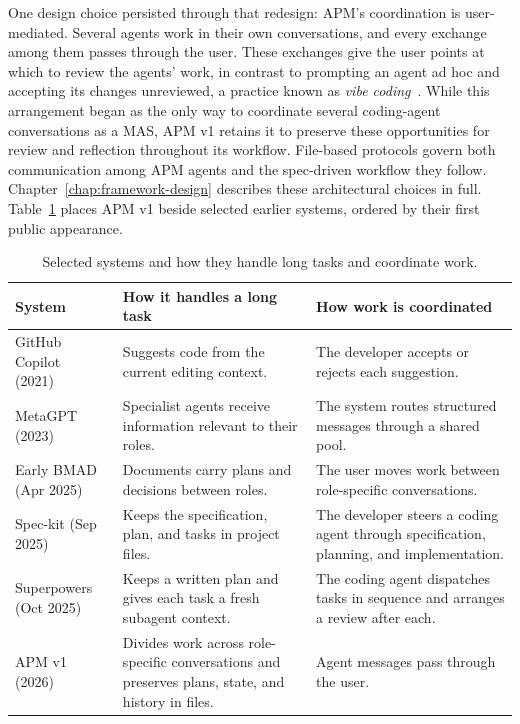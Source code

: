 One design choice persisted through that redesign: APM's coordination is user-mediated. Several agents work in their own conversations, and every exchange among them passes through the user. These exchanges give the user points at which to review the agents' work, in contrast to prompting an agent ad hoc and accepting its changes unreviewed, a practice known as \emph{vibe coding}~\cite{karpathy2025vibecoding, willison2025vibecoding}. While this arrangement began as the only way to coordinate several coding-agent conversations as a MAS, APM v1 retains it to preserve these opportunities for review and reflection throughout its workflow. File-based protocols govern both communication among APM agents and the spec-driven workflow they follow. Chapter~\ref{chap:framework-design} describes these architectural choices in full. Table~\ref{tab:background-systems-comparison} places APM v1 beside selected earlier systems, ordered by their first public appearance.

\begin{table}[H]
  \centering
  \small
  \setlength{\tabcolsep}{4pt}
  \caption{Selected systems and how they handle long tasks and coordinate work.}
  \label{tab:background-systems-comparison}
  \begin{tabular*}{\textwidth}{@{\extracolsep{\fill}}>{\raggedright\arraybackslash}p{}>{\raggedright\arraybackslash}p{}>{\raggedright\arraybackslash}p{}}
    \toprule
    System & How it handles a long task & How work is coordinated \\
    \midrule
    GitHub Copilot (2021)~\cite{friedman2021copilot} & Suggests code from the current editing context. & The developer accepts or rejects each suggestion. \\
    \addlinespace[2pt]
    MetaGPT (2023)~\cite{hong2024metagpt} & Specialist agents receive information relevant to their roles. & The system routes structured messages through a shared pool. \\
    \addlinespace[2pt]
    Early BMAD (Apr 2025)~\cite{bmad2025method} & Documents carry plans and decisions between roles. & The user moves work between role-specific conversations. \\
    \addlinespace[2pt]
    Spec-kit (Sep 2025)~\cite{delimarsky2025speckit} & Keeps the specification, plan, and tasks in project files. & The developer steers a coding agent through specification, planning, and implementation. \\
    \addlinespace[2pt]
    Superpowers (Oct 2025)~\cite{vincent2025superpowers} & Keeps a written plan and gives each task a fresh subagent context. & The coding agent dispatches tasks in sequence and arranges a review after each. \\
    \midrule
    APM v1 (2026) & Divides work across role-specific conversations and preserves plans, state, and history in files. & Agent messages pass through the user. \\
    \bottomrule
  \end{tabular*}
\end{table}

